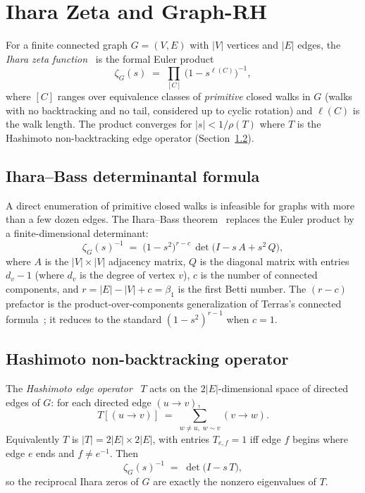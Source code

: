 \documentclass[11pt]{article}
\begin{document}
\section{Ihara Zeta and Graph-RH}
\label{sec:ihara_background}

For a finite connected graph $G=(V,E)$ with $|V|$ vertices and $|E|$
edges, the \emph{Ihara zeta function}~\cite{ihara1966} is the formal
Euler product
\begin{equation}
\zeta_G(s) \;=\; \prod_{[C]}\,\bigl(1 - s^{\ell(C)}\bigr)^{-1},
\label{eq:ihara_euler}
\end{equation}
where $[C]$ ranges over equivalence classes of \emph{primitive} closed
walks in $G$ (walks with no backtracking and no tail, considered up to
cyclic rotation) and $\ell(C)$ is the walk length.  The product
converges for $|s|<1/\rho(T)$ where $T$ is the Hashimoto
non-backtracking edge operator (Section~\ref{sec:hashimoto}).

\subsection{Ihara--Bass determinantal formula}

A direct enumeration of primitive closed walks is infeasible for graphs
with more than a few dozen edges.  The Ihara--Bass
theorem~\cite{bass1992} replaces the Euler product by a finite-dimensional
determinant:
\begin{equation}
\zeta_G(s)^{-1} \;=\; \bigl(1 - s^2\bigr)^{r - c}\,
    \det\!\bigl(I - s\,A + s^2\,Q\bigr),
\label{eq:ihara_bass}
\end{equation}
where $A$ is the $|V|\times|V|$ adjacency matrix, $Q$ is the diagonal
matrix with entries $d_v - 1$ (where $d_v$ is the degree of vertex $v$),
$c$ is the number of connected components, and
$r = |E| - |V| + c = \beta_1$ is the first Betti number.  The
$(r-c)$ prefactor is the product-over-components generalization of
Terras's connected formula~\cite[Thm.~2.3]{terras2010}; it reduces to
the standard $(1-s^2)^{r-1}$ when $c=1$.

\subsection{Hashimoto non-backtracking operator}
\label{sec:hashimoto}

The \emph{Hashimoto edge operator}~\cite{hashimoto1989} $T$ acts on
the $2|E|$-dimensional space of directed edges of $G$: for each
directed edge $(u\to v)$,
\begin{equation}
T[(u\to v)] \;=\; \sum_{w\neq u,\; w\sim v} (v\to w).
\end{equation}
Equivalently $T$ is $|T|=2|E|\times 2|E|$, with entries
$T_{e,f}=1$ iff edge $f$ begins where edge $e$ ends and $f\neq e^{-1}$.
Then
\begin{equation}
\zeta_G(s)^{-1} \;=\; \det\!\bigl(I - s\,T\bigr),
\label{eq:ihara_hashimoto}
\end{equation}
so the reciprocal Ihara zeros of $G$ are exactly the nonzero
eigenvalues of $T$.
\end{document}
